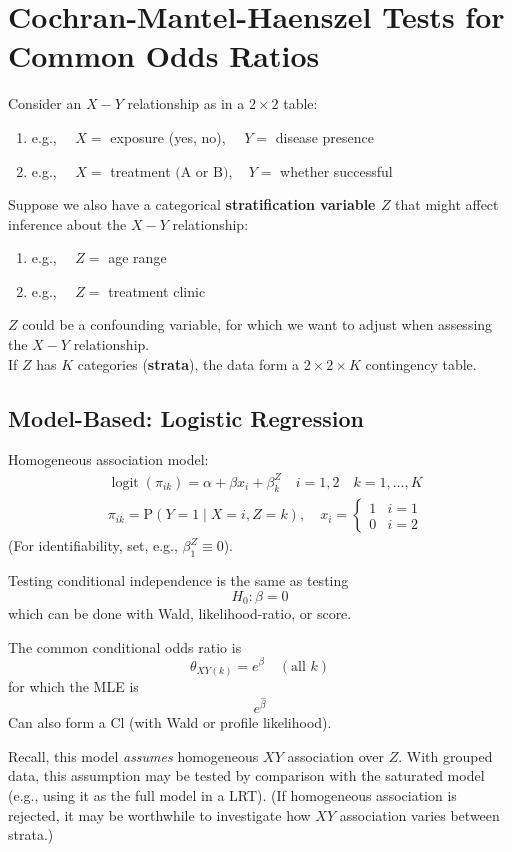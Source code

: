\documentclass[11pt]{elegantbook}
\begin{document}
\section{Cochran-Mantel-Haenszel Tests for Common Odds Ratios}
Consider an $X-Y$ relationship as in a $2 \times 2$ table:
\begin{enumerate}[-]
    \item e.g., $\quad X=$ exposure (yes, no), $\quad Y=$ disease presence
    \item e.g., $\quad X=$ treatment $(\mathrm{A}$ or $\mathrm{B}), \quad Y=$ whether successful
\end{enumerate}
Suppose we also have a categorical \textbf{stratification variable $Z$} that might affect inference about the $X-Y$ relationship:
\begin{enumerate}[-]
    \item e.g., $\quad Z=$ age range
    \item e.g., $\quad Z=$ treatment clinic
\end{enumerate}
$Z$ could be a confounding variable, for which we want to adjust when assessing the $X-Y$ relationship.\\
If $Z$ has $K$ categories (\textbf{strata}), the data form a $2 \times 2 \times K$ contingency table.

\subsection{Model-Based: Logistic Regression}
Homogeneous association model:
$$
\begin{aligned}
& \operatorname{logit}\left(\pi_{i k}\right)=\alpha+\beta x_i+\beta_k^Z \quad i=1,2 \quad k=1, \ldots, K \\
& \pi_{i k}=\mathrm{P}(Y=1 \mid X=i, Z=k), \quad x_i=\left\{\begin{matrix}
    1 & i=1 \\
    0 & i=2
\end{matrix}\right.
\end{aligned}
$$
(For identifiability, set, e.g., $\beta_1^Z \equiv 0$).

Testing conditional independence is the same as testing
$$
H_0: \beta=0
$$
which can be done with Wald, likelihood-ratio, or score.

The common conditional odds ratio is
$$
\theta_{X Y(k)}=e^\beta \quad(\text {all } k)
$$
for which the MLE is
$$e^{\hat{\beta}}$$
Can also form a $\mathrm{Cl}$ (with Wald or profile likelihood).

Recall, this model \textit{assumes} homogeneous $XY$ association over $Z$. With grouped data, this assumption may be tested by comparison with the saturated model (e.g., using it as the full model in a LRT). (If homogeneous association is rejected, it may be worthwhile to investigate how $XY$ association varies between strata.)
\end{document}
